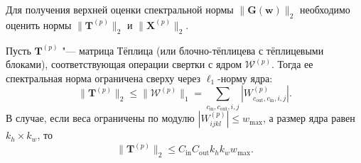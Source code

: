 Для получения верхней оценки спектральной нормы $\|\mathbf{G}(\mathbf{w})\|_2$ необходимо оценить нормы $\|\mathbf{T}^{(p)}\|_2$ и $\|\mathbf{X}^{(p)}\|_2$.

\begin{lemma}
    \label{lemma:toeplitz-norm}
    Пусть $\mathbf{T}^{(p)}$ "--- матрица Тёплица (или блочно-тёплицева с тёплицевыми блоками), соответствующая операции свертки с ядром $\mathcal{W}^{(p)}$. Тогда ее спектральная норма ограничена сверху через $\ell_1$-норму ядра:
    \begin{equation}
        \|\mathbf{T}^{(p)}\|_2 \leqslant \|\mathcal{W}^{(p)}\|_1 = \sum_{c_{\text{in}}, c_{\text{out}}, i, j} |W^{(p)}_{c_{\text{out}}, c_{\text{in}}, i, j}|.
    \end{equation}
    В случае, если веса ограничены по модулю $|W^{(p)}_{ijkl}| \leqslant w_{\max}$, а размер ядра равен $k_h \times k_w$, то
    \begin{equation}
        \|\mathbf{T}^{(p)}\|_2 \leqslant C_{\text{in}} C_{\text{out}} k_h k_w w_{\max}.
    \end{equation}
\end{lemma}
